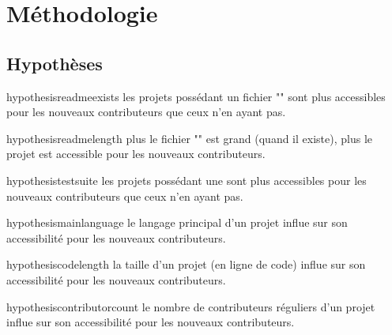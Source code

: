 \chapter{Méthodologie}

\newtheorem{hypo}{Hypothèse}
\newcommand{\newhyp}[2]{%
    \begin{restatable}{hypothesis}{#1}
        \label{hyp:#1}#2
    \end{restatable}%
}


\section{Hypothèses}

\newhyp{readmeexists}{%
    les projets possédant un fichier "\en{README}" sont plus accessibles pour les nouveaux contributeurs que
    ceux n'en ayant pas.%
}

\newhyp{readmelength}{%
    plus le fichier "" est grand (quand il existe), plus le projet est accessible pour les nouveaux
    contributeurs.%
}

\newhyp{testsuite}{%
    les projets possédant une \engl{test suite} sont plus accessibles pour les nouveaux contributeurs que ceux
    n'en ayant pas.%
}

\newhyp{mainlanguage}{%
    le langage principal d'un projet influe sur son accessibilité pour les nouveaux contributeurs.%
}

\newhyp{codelength}{%
    la taille d'un projet (en ligne de code) influe sur son accessibilité pour les nouveaux contributeurs.%
}

\newhyp{contributorcount}{%
    le nombre de contributeurs réguliers d'un projet influe sur son accessibilité pour les nouveaux
    contributeurs.%
}

